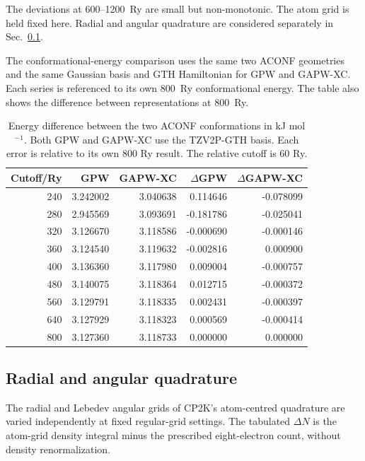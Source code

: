 \documentclass[10pt,a4paper]{article}
\begin{document}
The deviations at 600--1200~Ry are small but non-monotonic. The atom grid is held fixed here. Radial and angular quadrature are considered separately in Sec.~\ref{sec:quadrature}.
\FloatBarrier


The conformational-energy comparison uses the same two ACONF geometries and the same Gaussian basis and GTH Hamiltonian for GPW and GAPW-XC. Each series is referenced to its own 800~Ry conformational energy. The table also shows the difference between representations at 800~Ry.

\begin{table}[htbp]
\centering\small
\caption{Energy difference between the two ACONF conformations in kJ mol$^{-1}$. Both GPW and GAPW-XC use the TZV2P-GTH basis. Each error is relative to its own 800 Ry result. The relative cutoff is 60 Ry.}
\label{tab:aconf-cutoff}
\begin{tabular}{rrrrr}
\toprule
Cutoff/Ry & GPW & GAPW-XC & $\Delta$GPW & $\Delta$GAPW-XC\\
\midrule
240 & 3.242002 & 3.040638 & 0.114646 & -0.078099 \\
280 & 2.945569 & 3.093691 & -0.181786 & -0.025041 \\
320 & 3.126670 & 3.118586 & -0.000690 & -0.000146 \\
360 & 3.124540 & 3.119632 & -0.002816 & 0.000900 \\
400 & 3.136360 & 3.117980 & 0.009004 & -0.000757 \\
480 & 3.140075 & 3.118364 & 0.012715 & -0.000372 \\
560 & 3.129791 & 3.118335 & 0.002431 & -0.000397 \\
640 & 3.127929 & 3.118323 & 0.000569 & -0.000414 \\
800 & 3.127360 & 3.118733 & 0.000000 & 0.000000 \\
\bottomrule
\end{tabular}
\end{table}


\FloatBarrier

\subsection{Radial and angular quadrature}
\label{sec:quadrature}

The radial and Lebedev angular grids of CP2K's atom-centred quadrature\cite{CP2KMadeSimple2026} are varied independently at fixed regular-grid settings. The tabulated $\Delta N$ is the atom-grid density integral minus the prescribed eight-electron count, without density renormalization.
\end{document}
